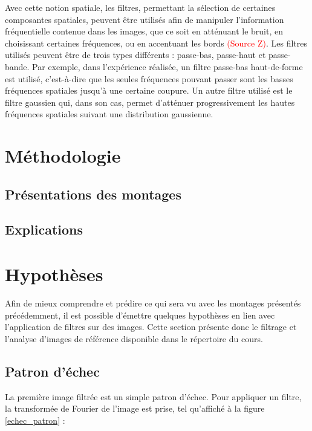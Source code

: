 \documentclass[11pt,letterpaper]{article}
\begin{document}
Avec cette notion spatiale, les filtres, permettant la sélection de certaines composantes spatiales, peuvent être utilisés afin de manipuler l'information fréquentielle contenue dans les images, que ce soit en atténuant le bruit, en choisissant certaines fréquences, ou en accentuant les bords \textcolor{red}{(Source Z)}. Les filtres utilisés peuvent être de trois types différents : passe-bas, passe-haut et passe-bande. Par exemple, dans l'expérience réalisée, un filtre passe-bas haut-de-forme est utilisé, c'est-à-dire que les seules fréquences pouvant passer sont les basses fréquences spatiales jusqu'à une certaine coupure. Un autre filtre utilisé est le filtre gaussien qui, dans son cas, permet d'atténuer progressivement les hautes fréquences spatiales suivant une distribution gaussienne.


\section{Méthodologie}

\subsection{Présentations des montages}

\subsection{Explications}

\section{Hypothèses}

Afin de mieux comprendre et prédire ce qui sera vu avec les montages présentés précédemment, il est possible d'émettre quelques hypothèses en lien avec l'application de filtres sur des images. Cette section présente donc le filtrage et l'analyse d'images de référence disponible dans le répertoire du cours.

\subsection{Patron d'échec}

La première image filtrée est un simple patron d'échec. Pour appliquer un filtre, la transformée de Fourier de l'image est prise, tel qu'affiché à la figure \ref{echec_patron} :
\end{document}
